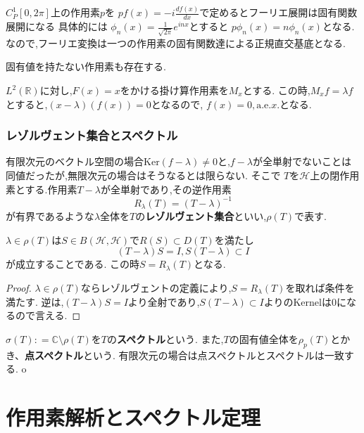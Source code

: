 \documentclass[uplatex]{jsbook}
\begin{document}
\begin{epl}
$C^1_P[0, 2\pi]$上の作用素$p$を
$pf(x) = - i \frac{df(x)}{dx}$で定めるとフーリエ展開は固有関数展開になる
具体的には
$\phi_n(x)= \frac{1}{\sqrt{2\pi}} e^{in x}$とすると
$p \phi_n(x) = n \phi_n(x)$となる.
なので,フーリエ変換は一つの作用素の固有関数達による正規直交基底となる.
\end{epl}

固有値を持たない作用素も存在する.

\begin{epl}
$L^2(\mathbb{R})$に対し,$F(x) = x$をかける掛け算作用素を$M_x$とする.
この時,$M_xf = \lambda f$とすると,$(x - \lambda)(f(x)) = 0$となるので,
$f(x) = 0, \mathrm{a.e.}x.$となる.
\end{epl}

\subsection{レゾルヴェント集合とスペクトル}

有限次元のベクトル空間の場合$\mathrm{Ker}(f - \lambda) \neq 0$と,$f - \lambda$が全単射でないことは同値だったが,無限次元の場合はそうなるとは限らない.
そこで
$T$を$\mathcal{H}$上の閉作用素とする.作用素$T - \lambda$が全単射であり,その逆作用素
\begin{equation*}
    R_{\lambda}(T) = (T - \lambda)^{-1}
\end{equation*}
が有界であるような$\lambda$全体を$T$の\textbf{レゾルヴェント集合}といい,$\rho(T)$で表す.

\begin{prop}
 $\lambda \in \rho(T)$は$S \in B(\mathcal{H}, \mathcal{H})$で$R(S) \subset D(T)$を満たし
 \begin{equation*}
   (T - \lambda) S = I, S(T - \lambda) \subset  I
 \end{equation*}
が成立することである. この時$S = R_{\lambda}(T)$となる.
\end{prop}
\begin{proof}
$\lambda \in \rho(T)$ならレゾルヴェントの定義により,$S = R_{\lambda}(T)$を取れば条件を満たす.
逆は,$(T - \lambda )S = I$より全射であり,$S(T - \lambda) \subset I$よりのKernelは0になるので言える.
\end{proof}

$\sigma(T): = \mathbb{C} \setminus \rho(T)$を$T$の\textbf{スペクトル}という.
また,$T$の固有値全体を$\rho_p(T)$とかき、\textbf{点スペクトル}という.
有限次元の場合は点スペクトルとスペクトルは一致する.
o

\chapter{作用素解析とスペクトル定理}
\end{document}
